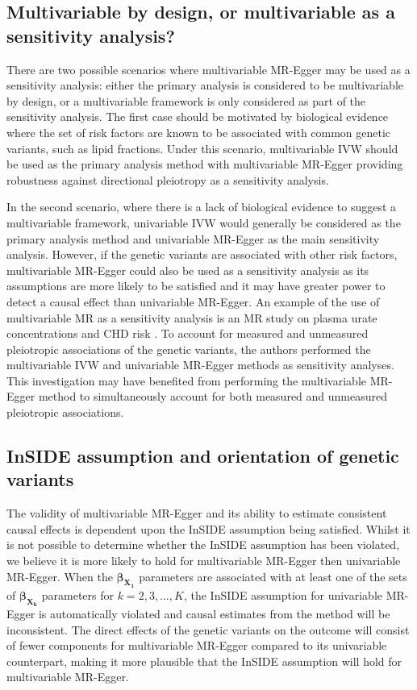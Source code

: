 \documentclass[a4paper,12pt]{article}
\begin{document}
\begin{bibunit}[wileyj]
\subsection{Multivariable by design, or multivariable as a sensitivity analysis?}
There are two possible scenarios where multivariable MR-Egger may be used as a sensitivity analysis: either the primary analysis is considered to be multivariable by design, or a multivariable framework is only considered as part of the sensitivity analysis. The first case should be motivated by biological evidence where the set of risk factors are known to be associated with common genetic variants, such as lipid fractions. Under this scenario, multivariable IVW should be used as the primary analysis method with multivariable MR-Egger providing robustness against directional pleiotropy as a sensitivity analysis.

In the second scenario, where there is a lack of biological evidence to suggest a multivariable framework, univariable IVW would generally be considered as the primary analysis method and univariable MR-Egger as the main sensitivity analysis. However, if the genetic variants are associated with other risk factors, multivariable MR-Egger could also be used as a sensitivity analysis as its assumptions are more likely to be satisfied and it may have greater power to detect a causal effect than univariable MR-Egger. An example of the use of multivariable MR as a sensitivity analysis is an MR study on plasma urate concentrations and CHD risk \cite{white2016urate}. To account for measured and unmeasured pleiotropic associations of the genetic variants, the authors performed the multivariable IVW and univariable MR-Egger methods as sensitivity analyses. This investigation may have benefited from performing the multivariable MR-Egger method to simultaneously account for both measured and unmeasured pleiotropic associations.

\subsection{InSIDE assumption and orientation of genetic variants}
The validity of multivariable MR-Egger and its ability to estimate consistent causal effects is dependent upon the InSIDE assumption being satisfied. Whilst it is not possible to determine whether the InSIDE assumption has been violated, we believe it is more likely to hold for multivariable MR-Egger then univariable MR-Egger. When the $\boldsymbol{\beta_{X_{1}}}$ parameters are associated with at least one of the sets of $\boldsymbol{\beta_{X_{k}}}$  parameters for $k = 2, 3, \ldots, K$, the InSIDE assumption for univariable MR-Egger is automatically violated and causal estimates from the method will be inconsistent. The direct effects of the genetic variants on the outcome will consist of fewer components for multivariable MR-Egger compared to its univariable counterpart, making it more plausible that the InSIDE assumption will hold for multivariable MR-Egger.


\end{bibunit}
\end{document}
